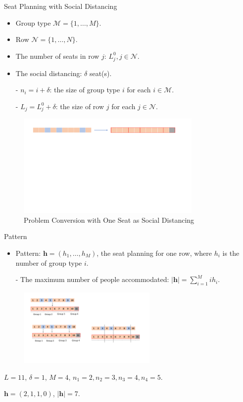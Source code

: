 \begin{frame}{Seat Planning with Social Distancing}
  \begin{itemize}  
    \item Group type $\mathcal{M} = \{1, \ldots, M\}$.
    \item Row $\mathcal{N} = \{1, \ldots, N\}$.
    \item The number of seats in row $j$: $L_j^{0}, j \in \mathcal{N}$.
    \item The social distancing: $\delta$ seat(s).
    \item[-] $n_i = i + \delta$: the size of group type $i$ for each $i \in \mathcal{M}$.
    \item[-] $L_j = L_j^{0} + \delta$: the size of row $j$ for each $j \in \mathcal{N}$.
    \end{itemize}
    
    \begin{figure}[ht]
      \centering
      \includegraphics[width = 0.8\textwidth]{./images/dummy_seat.pdf}
      \caption{Problem Conversion with One Seat as Social Distancing}
  \end{figure}
  \end{frame}

  \begin{frame}{Pattern}
    \begin{itemize}
      \item Pattern: $\bm{h} = (h_1, \ldots, h_M)$, the seat planning for one row, where $h_i$ is the number of group type $i$.

      - The maximum number of people accommodated: $|\bm{h}| = \sum_{i =1}^{M} i h_i$.
    \end{itemize}
    
    \begin{figure}[ht]
      \centering
      \includegraphics[width = 0.6\textwidth]{./images/conversion1.pdf}
    \end{figure}
    \centering
    $L = 11$, $\delta =1$, $M =4$, $n_1 = 2, n_2 = 3, n_3 = 4, n_4 = 5$. 

    $\bm{h} = (2, 1, 1, 0)$, $|\bm{h}| = 7$.
  \end{frame}

